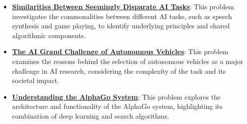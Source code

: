 \documentclass{article}%
\begin{document}
\begin{itemize}[leftmargin=*]
\item \href{https://purdue.brightspace.com/d2l/common/assets/pdfjs-d2l-dist/1.0.14-legacy/web/viewer.html?file=\%2Fcontent\%2Fenforced\%2F1095467-wl.202510.CS.24300.001\%2F02L2-Intro.pdf\%3Fou\%3D1095467\&lang=en-us\&container=d2l-fileviewer-rendered-pdf\&fullscreen=d2l-fileviewer-rendered-pdf-dialog\&height=667#page=31}{\textbf{Similarities Between Seemingly Disparate AI Tasks}}: This problem investigates the commonalities between different AI tasks, such as speech synthesis and game playing, to identify underlying principles and shared algorithmic components.%
\item \href{https://purdue.brightspace.com/d2l/common/assets/pdfjs-d2l-dist/1.0.14-legacy/web/viewer.html?file=\%2Fcontent\%2Fenforced\%2F1095467-wl.202510.CS.24300.001\%2F02L2-Intro.pdf\%3Fou\%3D1095467\&lang=en-us\&container=d2l-fileviewer-rendered-pdf\&fullscreen=d2l-fileviewer-rendered-pdf-dialog\&height=667#page=43}{\textbf{The AI Grand Challenge of Autonomous Vehicles}}: This problem examines the reasons behind the selection of autonomous vehicles as a major challenge in AI research, considering the complexity of the task and its societal impact.%
\item \href{https://purdue.brightspace.com/d2l/common/assets/pdfjs-d2l-dist/1.0.14-legacy/web/viewer.html?file=\%2Fcontent\%2Fenforced\%2F1095467-wl.202510.CS.24300.001\%2F02L2-Intro.pdf\%3Fou\%3D1095467\&lang=en-us\&container=d2l-fileviewer-rendered-pdf\&fullscreen=d2l-fileviewer-rendered-pdf-dialog\&height=667#page=50}{\textbf{Understanding the AlphaGo System}}: This problem explores the architecture and functionality of the AlphaGo system, highlighting its combination of deep learning and search algorithms.%
\end{itemize}%
\end{document}
